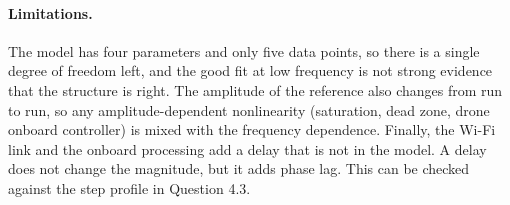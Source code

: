 \paragraph{Limitations.}
The model has four parameters and only five data points, so there is a single degree of freedom left, and the good fit at low frequency is not strong evidence that the structure is right.
The amplitude of the reference also changes from run to run, so any amplitude-dependent nonlinearity (saturation, dead zone, drone onboard controller) is mixed with the frequency dependence.
Finally, the Wi-Fi link and the onboard processing add a delay that is not in the model.
A delay does not change the magnitude, but it adds phase lag.
This can be checked against the step profile in Question 4.3.
